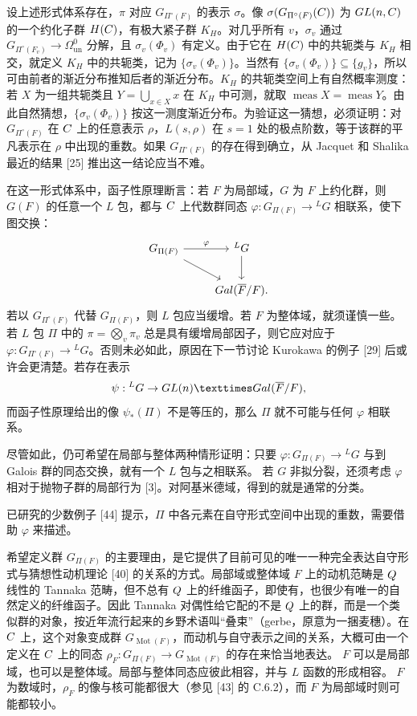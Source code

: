 设上述形式体系存在，$\pi$ 对应 $G_{\Pi^\circ(F)}$ 的表示 $\sigma$。像
$\sigma(G_{\Pi^\circ(F)}(C))$ 为 $GL(n,C)$ 的一个约化子群 $H(C)$，有极大紧子群
$K_H$。对几乎所有 $v$，$\sigma_v$ 通过
$G_{\Pi^\circ(F_v)}\to\Omega_{\mathrm{un}}^0$ 分解，且 $\sigma_v(\Phi_v)$ 有定义。由于它在
$H(C)$ 中的共轭类与 $K_H$ 相交，就定义 $K_H$ 中的共轭类，记为
$\{\sigma_v(\Phi_v)\}$。当然有 $\{\sigma_v(\Phi_v)\}\subseteq\{g_v\}$，所以可由前者的渐近分布推知后者的渐近分布。$K_H$ 的共轭类空间上有自然概率测度：若
$X$ 为一组共轭类且 $Y=\bigcup_{x\in X}x$ 在 $K_H$ 中可测，就取
$\operatorname{meas}X=\operatorname{meas}Y$。由此自然猜想，$\{\sigma_v(\Phi_v)\}$ 按这一测度渐近分布。为验证这一猜想，必须证明：对
$G_{\Pi^\circ(F)}$ 在 $C$ 上的任意表示 $\rho$，$L(s,\rho)$ 在 $s=1$ 处的极点阶数，等于该群的平凡表示在 $\rho$ 中出现的重数。如果
$G_{\Pi^\circ(F)}$ 的存在得到确立，从 Jacquet 和 Shalika 最近的结果 [25] 推出这一结论应当不难。

在这一形式体系中，函子性原理断言：若 $F$ 为局部域，$G$ 为 $F$ 上约化群，则
$G(F)$ 的任意一个 $L$ 包，都与 $C$ 上代数群同态
$\varphi:G_{\Pi(F)}\to{}^LG$ 相联系，使下图交换：
\[
\begin{tikzcd}
G_{\Pi(F)}\arrow[r,"\varphi"]\arrow[dr] & {}^LG\arrow[d]\\
&\Gal(\overline F/F).
\end{tikzcd}
\]
若以 $G_{\Pi^\circ(F)}$ 代替 $G_{\Pi(F)}$，则 $L$ 包应当缓增。若 $F$ 为整体域，就须谨慎一些。若
$L$ 包 $\Pi$ 中的 $\pi=\bigotimes_v\pi_v$ 总是具有缓增局部因子，则它应对应于
$\varphi:G_{\Pi^\circ(F)}\to{}^LG$。否则未必如此，原因在下一节讨论 Kurokawa 的例子 [29] 后或许会更清楚。若存在表示
\[
\psi:{}^LG\to\GL(n)\times\Gal(\overline F/F),
\]
而函子性原理给出的像 $\psi_*(\Pi)$ 不是等压的，那么 $\Pi$ 就不可能与任何
$\varphi$ 相联系。

尽管如此，仍可希望在局部与整体两种情形证明：只要
$\varphi:G_{\Pi(F)}\to{}^LG$ 与到 Galois 群的同态交换，就有一个 $L$ 包与之相联系。
若 $G$ 非拟分裂，还须考虑 $\varphi$ 相对于抛物子群的局部行为 [3]。对阿基米德域，得到的就是通常的分类。

已研究的少数例子 [44] 提示，$\Pi$ 中各元素在自守形式空间中出现的重数，需要借助 $\varphi$ 来描述。

希望定义群 $G_{\Pi(F)}$ 的主要理由，是它提供了目前可见的唯一一种完全表达自守形式与猜想性动机理论 [40] 的关系的方式。局部域或整体域 $F$ 上的动机范畴是
$Q$ 线性的 Tannaka 范畴，但不总有 $Q$ 上的纤维函子，即使有，也很少有唯一的自然定义的纤维函子。因此 Tannaka 对偶性给它配的不是
$Q$ 上的群，而是一个类似群的对象，按近年流行起来的乡野术语叫“叠束”（gerbe，原意为一捆麦穗）。在
$C$ 上，这个对象变成群 $G_{\operatorname{Mot}(F)}$，而动机与自守表示之间的关系，大概可由一个定义在
$C$ 上的同态
$\rho_F:G_{\Pi(F)}\to G_{\operatorname{Mot}(F)}$ 的存在来恰当地表达。
$F$ 可以是局部域，也可以是整体域。局部与整体同态应彼此相容，并与 $L$ 函数的形成相容。
$F$ 为数域时，$\rho_F$ 的像与核可能都很大（参见 [43] 的 C.6.2），而 $F$ 为局部域时则可能都较小。

